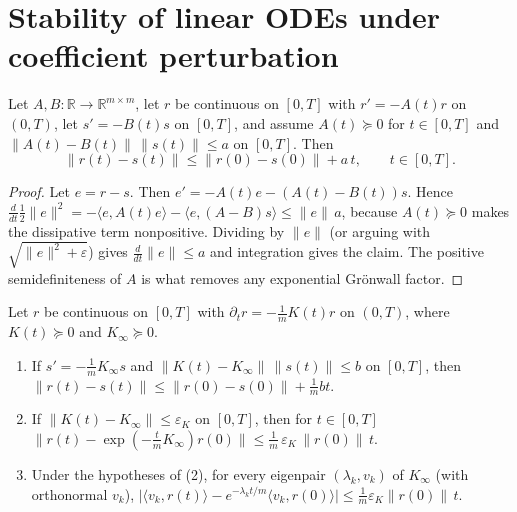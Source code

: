 \section{Stability of linear ODEs under coefficient perturbation}\label{sec:ntkgf:odeStability}

\begin{theorem}\label{thm:ntkgf:odePerturbation}
  \leanok
Let $A,B:\mathbb R\to\mathbb R^{m\times m}$, let $r$ be continuous on $[0,T]$ with $r'=-A(t)r$ on $(0,T)$, let $s'=-B(t)s$ on $[0,T]$, and assume
$A(t)\succeq0$ for $t\in[0,T]$ and $\|A(t)-B(t)\|\,\|s(t)\|\le a$ on $[0,T]$. Then
\[
  \|r(t)-s(t)\|\le\|r(0)-s(0)\|+a\,t,\qquad t\in[0,T].
\]
\end{theorem}

\begin{proof}
  \leanok
Let $e=r-s$. Then $e'=-A(t)e-(A(t)-B(t))s$. Hence $\frac{d}{dt}\tfrac12\|e\|^2=-\langle e,A(t)e\rangle-\langle e,(A-B)s\rangle\le\|e\|\,a$, because $A(t)\succeq0$ makes the
dissipative term nonpositive. Dividing by $\|e\|$ (or arguing with $\sqrt{\|e\|^2+\varepsilon}$) gives $\frac d{dt}\|e\|\le a$ and integration gives the claim. The
positive semidefiniteness of $A$ is what removes any exponential Gr\"onwall factor.
\end{proof}

\begin{theorem}\label{thm:ntkgf:residualFrozen}
  \leanok
Let $r$ be continuous on $[0,T]$ with $\partial_tr=-\frac1mK(t)r$ on $(0,T)$, where $K(t)\succeq0$ and $K_\infty\succeq0$.
\begin{enumerate}
  \item If $s'=-\frac1mK_\infty s$ and $\|K(t)-K_\infty\|\,\|s(t)\|\le b$ on $[0,T]$, then $\|r(t)-s(t)\|\le\|r(0)-s(0)\|+\frac1mbt$.
  \item If $\|K(t)-K_\infty\|\le\varepsilon_K$ on $[0,T]$, then for $t\in[0,T]$
        $\bigl\|r(t)-\exp(-\tfrac tmK_\infty)r(0)\bigr\|\le\frac1m\,\varepsilon_K\,\|r(0)\|\,t.$
  \item Under the hypotheses of (2), for every eigenpair $(\lambda_k,v_k)$ of $K_\infty$ (with orthonormal $v_k$),
        $\bigl|\langle v_k,r(t)\rangle-e^{-\lambda_kt/m}\langle v_k,r(0)\rangle\bigr|\le\frac1m\varepsilon_K\|r(0)\|\,t$.
\end{enumerate}
\end{theorem}

